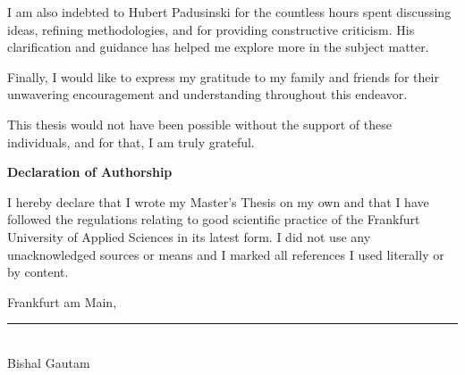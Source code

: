 {\begin{titlepage}
    I am also indebted to Hubert Padusinski for the countless hours spent discussing ideas, refining methodologies, and for providing constructive criticism. His clarification and guidance has helped me explore more in the subject matter.

    Finally, I would like to express my gratitude to my family and friends for their unwavering encouragement and understanding throughout this endeavor.

    This thesis would not have been possible without the support of these individuals, and for that, I am truly grateful.
 \vspace*{\fill}
\end{titlepage}





\begin{titlepage}
    \vspace*{\fill}
    {\Large\textbf{Declaration of Authorship}\par}\bigskip%
    I hereby declare that I wrote my Master's Thesis on my own and that I have followed the regulations relating to good scientific practice of the Frankfurt University of Applied Sciences in its latest form. I did not use any unacknowledged sources or means and I marked all references I used literally or by content.\par\bigskip%
    Frankfurt am Main, \EndDatum\par\vspace{5ex}%
    \vspace{2ex}
    \rule{4cm}{0.4pt} %
    \vspace{0.5em} \\ Bishal Gautam
    \vspace*{\fill}
\end{titlepage}



}

\maketitle
